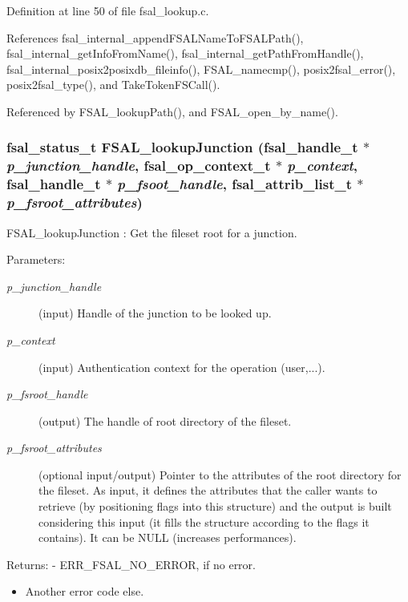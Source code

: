 Definition at line 50 of file fsal\_\-lookup.c.

References fsal\_\-internal\_\-appendFSALNameToFSALPath(), fsal\_\-internal\_\-getInfoFromName(), fsal\_\-internal\_\-getPathFromHandle(), fsal\_\-internal\_\-posix2posixdb\_\-fileinfo(), FSAL\_\-namecmp(), posix2fsal\_\-error(), posix2fsal\_\-type(), and TakeTokenFSCall().

Referenced by FSAL\_\-lookupPath(), and FSAL\_\-open\_\-by\_\-name().
\subsubsection[{FSAL\_\-lookupJunction}]{\setlength{\rightskip}{0pt plus 5cm}fsal\_\-status\_\-t FSAL\_\-lookupJunction (fsal\_\-handle\_\-t $\ast$ {\em p\_\-junction\_\-handle}, \/  fsal\_\-op\_\-context\_\-t $\ast$ {\em p\_\-context}, \/  fsal\_\-handle\_\-t $\ast$ {\em p\_\-fsoot\_\-handle}, \/  fsal\_\-attrib\_\-list\_\-t $\ast$ {\em p\_\-fsroot\_\-attributes})}\label{fsal__lookup_8c_6bdedadb7c4448da0d38f7382af1cc10}


FSAL\_\-lookupJunction : Get the fileset root for a junction.

\begin{Desc}
\item[Parameters:]
\begin{description}
\item[{\em p\_\-junction\_\-handle}](input) Handle of the junction to be looked up. \item[{\em p\_\-context}](input) Authentication context for the operation (user,...). \item[{\em p\_\-fsroot\_\-handle}](output) The handle of root directory of the fileset. \item[{\em p\_\-fsroot\_\-attributes}](optional input/output) Pointer to the attributes of the root directory for the fileset. As input, it defines the attributes that the caller wants to retrieve (by positioning flags into this structure) and the output is built considering this input (it fills the structure according to the flags it contains). It can be NULL (increases performances).\end{description}
\end{Desc}
\begin{Desc}
\item[Returns:]- ERR\_\-FSAL\_\-NO\_\-ERROR, if no error.\begin{itemize}
\item Another error code else. \end{itemize}
\end{Desc}


